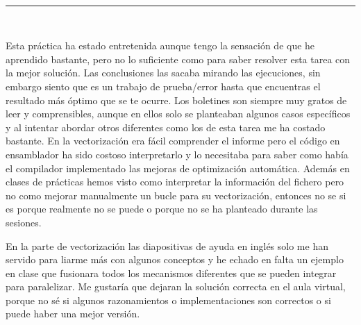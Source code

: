   \begin{center}
	{\fboxrule=4pt } \\
	\rule{15cm}{0pt} \\
\end{center}

\par Esta práctica ha estado entretenida aunque tengo la sensación de que he aprendido bastante, pero no lo suficiente como para saber
resolver esta tarea con la mejor solución. Las conclusiones las sacaba mirando las ejecuciones, sin embargo siento que es un trabajo de 
prueba/error hasta que encuentras el resultado más óptimo que se te ocurre. Los boletines son siempre muy gratos de leer y comprensibles,
aunque en ellos solo se planteaban algunos casos específicos y al intentar abordar otros diferentes como los de esta tarea me ha
costado bastante. En la vectorización era fácil comprender el informe pero el código en ensamblador ha sido costoso interpretarlo
y lo necesitaba para saber como había el compilador implementado las mejoras de optimización automática. Además en clases de
prácticas hemos visto como interpretar la información del fichero pero no como mejorar manualmente un bucle para su
vectorización, entonces no se si es porque realmente no se puede o porque no se ha planteado durante las sesiones.
\par En la parte de vectorización las
diapositivas de ayuda en inglés solo me han servido para liarme más con algunos conceptos y he echado en falta un ejemplo en
clase que fusionara todos los mecanismos diferentes que se pueden integrar para paralelizar. Me gustaría
que dejaran la solución correcta en el aula virtual, porque no sé si algunos razonamientos o implementaciones son correctos o si
puede haber una mejor versión. 